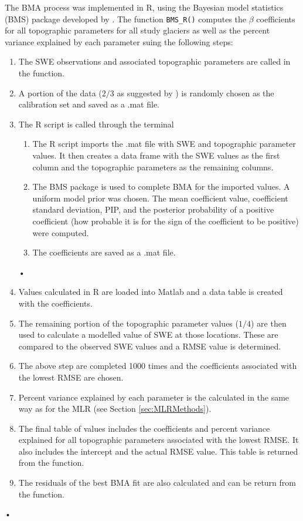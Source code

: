 \documentclass[12pt]{article}
\begin{document}
The BMA process was implemented in R, using the Bayesian model statistics (BMS) package developed by \cite{Zeugner2015}. The function \texttt{BMS\_R()} computes the $\beta$ coefficients for all topographic parameters for all study glaciers as well as the percent variance explained by each parameter suing the following steps:
\begin{enumerate}
\item The SWE observations and associated topographic parameters are called in the function.
\item A portion of the data ($2/3$ as suggested by \cite{Kohavi1995}) is randomly chosen as the calibration set and saved as a .mat file. 
\item The R script is called through the terminal
	\begin{enumerate}
		\item The R script imports the .mat file with SWE and topographic parameter values. It then creates a data 				frame with the SWE values as the first column and the topographic parameters as the remaining 					columns. 
		\item The BMS package is used to complete BMA for the imported values. A uniform model prior was chosen. 				The mean coefficient value, coefficient standard deviation, PIP, and the posterior probability of a positive 			coefficient (how probable it is for the sign of the coefficient to be positive) were computed.
		\item The coefficients are saved as a .mat file.
	\end{enumerate}•
\item Values calculated in R are loaded into Matlab and a data table is created with the coefficients.
\item The remaining portion of the topographic parameter values ($1/4$) are then used to calculate a modelled value of 		SWE at those locations. These are compared to the observed SWE values and a RMSE value is determined.
\item The above step are completed 1000 times and the coefficients associated with the lowest RMSE are chosen.
\item Percent variance explained by each parameter is the calculated in the same way as for the MLR (see Section 			\ref{sec:MLRMethods}). 
\item The final table of values includes the coefficients and percent variance explained for all topographic parameters associated with the lowest RMSE. It also includes the intercept and the actual RMSE value. This table is returned from the function.
\item The residuals of the best BMA fit are also calculated and can be return from the function.  
\end{enumerate}•
\end{document}
